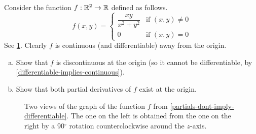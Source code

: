 \begin{exercise} \label{partials-dont-imply-differentiable}
	Consider the function $f : \mathbb{R}^2 \to \mathbb{R}$ defined as follows.
	\[ f(x, y) = \begin{cases} \dfrac{x y}{x^2 + y^2} &  \text{if } (x, y) \neq 0 \\ 0 & \text{if } (x, y) = 0 \end{cases} \]
	See \cref{partials-dont-imply-differentiable-graph}. Clearly $f$ is continuous (and differentiable) away from the origin.
	\begin{enumerate}[(a)]
		\item Show that $f$ is discontinuous at the origin (so it cannot be differentiable, by \cref{differentiable-implies-continuous}). 
		\item Show that both partial derivatives of $f$ exist at the origin. 
	\end{enumerate} 
	\begin{figure}[ht]
		\begin{center}
		\end{center}
		\caption{Two views of the graph of the function $f$ from \cref{partials-dont-imply-differentiable}. The one on the left is obtained from the one on the right by a 90$^\circ$ rotation counterclockwise around the $z$-axis.} \label{partials-dont-imply-differentiable-graph}
	\end{figure}
\end{exercise}

